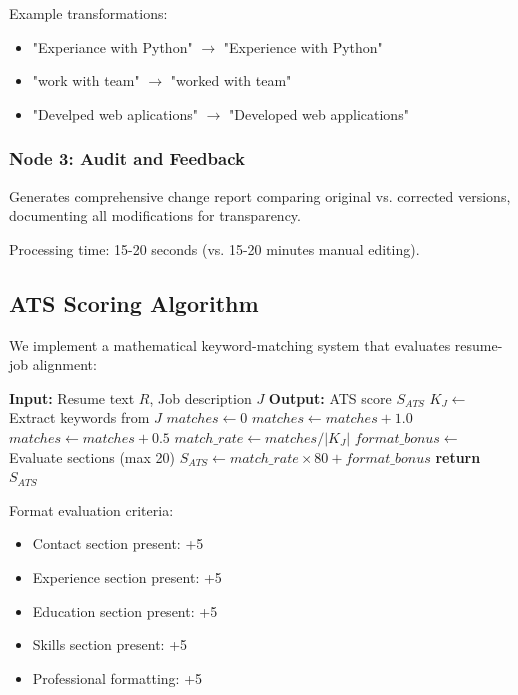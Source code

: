 \documentclass[conference]{IEEEtran}
\begin{document}
Example transformations:
\begin{itemize}
    \item "Experiance with Python" $\rightarrow$ "Experience with Python"
    \item "work with team" $\rightarrow$ "worked with team"
    \item "Develped web aplications" $\rightarrow$ "Developed web applications"
\end{itemize}

\subsubsection{Node 3: Audit and Feedback}

Generates comprehensive change report comparing original vs. corrected versions, documenting all modifications for transparency.

Processing time: 15-20 seconds (vs. 15-20 minutes manual editing).

\subsection{ATS Scoring Algorithm}

We implement a mathematical keyword-matching system that evaluates resume-job alignment:

\begin{algorithm}[h]
\caption{ATS Score Calculation}
\label{alg:ats_score}
\begin{algorithmic}[1]
\STATE \textbf{Input:} Resume text $R$, Job description $J$
\STATE \textbf{Output:} ATS score $S_{ATS}$
\STATE
\STATE $K_J \leftarrow$ Extract keywords from $J$
\STATE $matches \leftarrow 0$
        \STATE $matches \leftarrow matches + 1.0$
        \STATE $matches \leftarrow matches + 0.5$
    \ENDIF
\ENDFOR
\STATE $match\_rate \leftarrow matches / |K_J|$
\STATE $format\_bonus \leftarrow$ Evaluate sections (max 20)
\STATE $S_{ATS} \leftarrow match\_rate \times 80 + format\_bonus$
\STATE \textbf{return} $S_{ATS}$
\end{algorithmic}
\end{algorithm}

Format evaluation criteria:
\begin{itemize}
    \item Contact section present: +5
    \item Experience section present: +5
    \item Education section present: +5
    \item Skills section present: +5
    \item Professional formatting: +5
\end{itemize}
\end{document}
